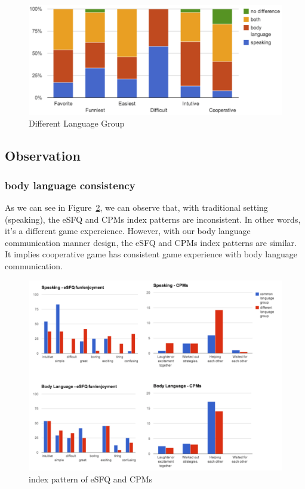 \begin{figure}[!h]
\centering
\includegraphics[width=0.9\columnwidth]{Figures/US_FQ_Dif.png}
\caption{Different Language Group}
\label{fig:US_FQ_Dif}
\end{figure}



\subsection{Observation}

\subsubsection{body language consistency}
As we can see in Figure~\ref{fig:US_Consistent}, we can observe that, with traditional setting (speaking), the eSFQ and CPMs index patterns are inconsistent. In other words, it's a different game expereience. However, with our body language communication manner design, the eSFQ and CPMs index patterns are similar. It implies cooperative game has consistent game experience with body language communication.

\begin{figure}[!h]
\centering
\includegraphics[width=1.1\columnwidth]{Figures/US_Consistent.png}
\caption{index pattern of eSFQ and CPMs}
\label{fig:US_Consistent}
\end{figure}

